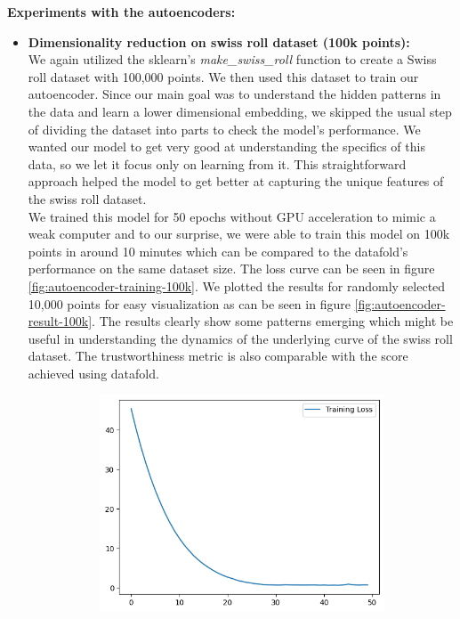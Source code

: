 \begin{itemize}
	      \textbf{Experiments with the autoencoders:}
	      \begin{itemize}
	      	\item \textbf{Dimensionality reduction on swiss roll dataset (100k points):}\\
	      	      We again utilized the sklearn's \textit{make\_swiss\_roll} function to create a Swiss roll dataset with 100,000 points. We then used this dataset to train our autoencoder. Since our main goal was to understand the hidden patterns in the data and learn a lower dimensional embedding, we skipped the usual step of dividing the dataset into parts to check the model's performance. We wanted our model to get very good at understanding the specifics of this data, so we let it focus only on learning from it. This straightforward approach helped the model to get better at capturing the unique features of the swiss roll dataset. \\
	      	      We trained this model for 50 epochs without GPU acceleration to mimic a weak computer and to our surprise, we were able to train this model on 100k points in around 10 minutes which can be compared to the datafold's performance on the same dataset size. The loss curve can be seen in figure \ref{fig:autoencoder-training-100k}. We plotted the results for randomly selected 10,000 points for easy visualization as can be seen in figure \ref{fig:autoencoder-result-100k}. The results clearly show some patterns emerging which might be useful in understanding the dynamics of the underlying curve of the swiss roll dataset. The trustworthiness metric is also comparable with the score achieved using datafold.
               \begin{figure}[H]
	      	\centering
	      	\begin{subfigure}{0.45\textwidth}
	      		\includegraphics[width=\linewidth]{images/autoencoder_training_100k.png}

\end{subfigure}
\end{figure}
\end{itemize}
\end{itemize}
